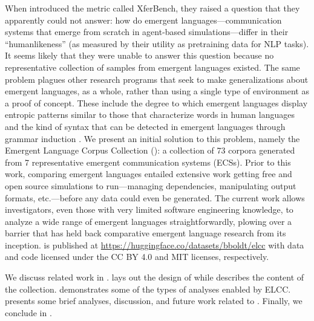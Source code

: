 When \citet{xferbench} introduced the metric called XferBench, they raised a question that they apparently could not answer:
how do emergent languages---communication systems that emerge from scratch in agent-based simulations---differ in their ``humanlikeness'' (as measured by their utility as pretraining data for NLP tasks).
It seems likely that they were unable to answer this question because no representative collection of samples from emergent languages existed.
The same problem plagues other research programs that seek to make generalizations about emergent languages, as a whole, rather than using a single type of environment as a proof of concept.
These include the degree to which emergent languages display entropic patterns similar to those that characterize words in human languages \citep{ueda2023on} and the kind of syntax that can be detected in emergent languages through grammar induction \citep{van-der-wal-etal-2020-grammar}.
We present an initial solution to this problem, namely the Emergent Language Corpus Collection (\theLib{}): a collection of 73 corpora generated from 7 representative emergent communication systems (ECSs).\footnotemark{}
Prior to this work, comparing emergent languages entailed extensive work getting free and open source simulations to run---managing dependencies, manipulating output formats, etc.---before any data could even be generated.
The current work allows investigators, even those with very limited software engineering knowledge, to analyze a wide range of emergent languages straightforwardly, plowing over a barrier that has held back comparative emergent language research from its inception.
\theLib{} is published at \url{https://huggingface.co/datasets/bboldt/elcc} with data and code licensed under the CC BY 4.0 and  MIT licenses, respectively.

We discuss related work in .
 lays out the design of \theLib{} while  describes the content of the collection.
 demonstrates some of the types of analyses enabled by ELCC\@.
 presents some brief analyses, discussion, and future work related to \theLib{}.
Finally, we conclude in .



